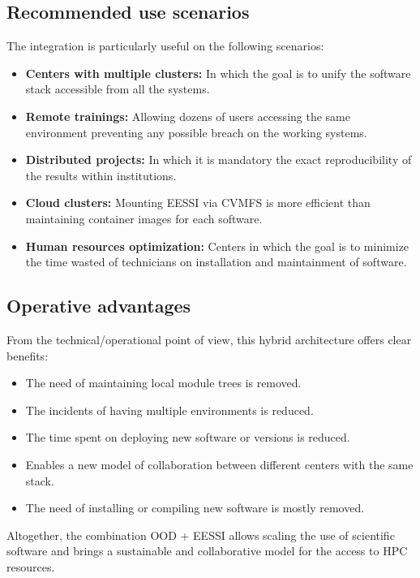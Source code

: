 \documentclass[11pt,a4paper]{article}
\begin{document}
\subsection{Recommended use scenarios}

The integration is particularly useful on the following scenarios:

\begin{itemize}
    \item \textbf{Centers with multiple clusters:} In which the goal is to unify the software stack accessible from all the systems.
    \item \textbf{Remote trainings:} Allowing dozens of users accessing the same environment preventing any possible breach on the working systems.
    \item \textbf{Distributed projects:} In which it is mandatory the exact reproducibility of the results within institutions.
    \item \textbf{Cloud clusters:} Mounting EESSI via CVMFS is more efficient than maintaining container images for each software.

    \item \textbf{Human resources optimization:} Centers in which the goal is to minimize the time wasted of technicians on installation and maintainment of software.
\end{itemize}

\subsection{Operative advantages}

From the technical/operational point of view, this hybrid architecture offers clear benefits:

\begin{itemize}
    \item The need of maintaining local module trees is removed.
    \item The incidents of having multiple environments is reduced.
    \item The time spent on deploying new software or versions is reduced.
    \item Enables a new model of collaboration between different centers with the same stack.
    \item The need of installing or compiling new software is mostly removed.
\end{itemize}

\bigskip

Altogether, the combination OOD + EESSI allows scaling the use of scientific software and brings a sustainable and collaborative model for the access to HPC resources.
\bigskip
\bigskip
\bigskip
\bigskip
\bigskip
\end{document}
